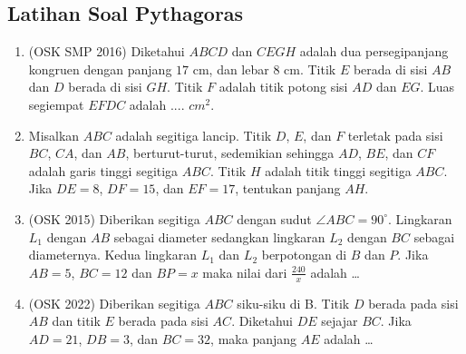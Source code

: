 \subsection{Latihan Soal Pythagoras}
\begin{enumerate}
    \item (OSK SMP 2016) Diketahui $ABCD$ dan $CEGH$ adalah dua persegipanjang kongruen dengan panjang $17$ cm, dan lebar $8$ cm. Titik $E$ berada di sisi $AB$ dan $D$ berada di sisi $GH$. Titik $F$ adalah titik potong sisi $AD$ dan $EG$. Luas segiempat $EFDC$ adalah .... $cm^2$.

    \item Misalkan $ABC$ adalah segitiga lancip. Titik $D$, $E$, dan $F$ terletak pada sisi $BC$, $CA$, dan $AB$, berturut-turut, sedemikian sehingga $AD$, $BE$, dan $CF$ adalah garis tinggi segitiga $ABC$. Titik $H$ adalah titik tinggi segitiga $ABC$. Jika $DE = 8$, $DF = 15$, dan $EF = 17$, tentukan panjang $AH$.

    \item (OSK 2015) Diberikan segitiga $ABC$ dengan sudut $\angle ABC = 90^\circ$. Lingkaran $L_1$ dengan $AB$ sebagai diameter sedangkan lingkaran $L_2$ dengan $BC$ sebagai diameternya. Kedua lingkaran $L_1$ dan $L_2$ berpotongan di $B$ dan $P$. Jika $AB = 5$, $BC = 12$ dan $BP = x$ maka nilai dari $\frac{240}{x}$ adalah \ldots

    \item (OSK 2022) Diberikan segitiga $ABC$ siku-siku di B. Titik $D$ berada pada sisi $AB$ dan titik $E$ berada pada sisi $AC$. Diketahui $DE$ sejajar $BC$. Jika $AD = 21$, $DB = 3$, dan $BC = 32$, maka panjang $AE$ adalah \dots

\end{enumerate}